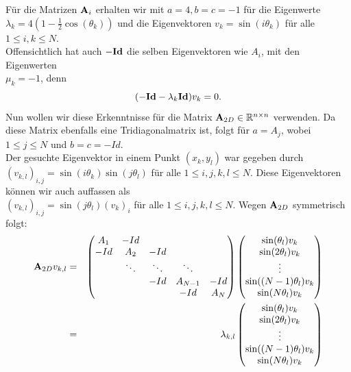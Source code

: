 Für die Matrizen ${\textbf{A}}_{i}$ erhalten wir mit $a = 4, b = c = -1$ für die Eigenwerte \\$\lambda_{k} = 4 (1 - \frac{1}{2} \cos(\theta_{k}))$ und die Eigenvektoren $v_{k} = \sin(i\theta_{k})$ für alle $1 \le i,k \le N$.\\
Offensichtlich hat auch $-{\textbf{Id}}$ die selben Eigenvektoren wie $A_{i}$, mit den Eigenwerten \\$\mu_{k} = -1$, denn
\begin{equation}
(-{\textbf{Id}} - \lambda_{k}{\textbf{Id}}) v_{k} = 0.
\end{equation}
Nun wollen wir diese Erkenntnisse für die Matrix ${\textbf{A}}_{2D} \in \mathbb{R}^{n \times n}$ verwenden. Da diese Matrix ebenfalls eine Tridiagonalmatrix ist, folgt für $a = A_{j}$, wobei $1 \le j \le N$ und $b = c = -Id$.\\
Der gesuchte Eigenvektor in einem Punkt $(x_{k},y_{l})$ war gegeben durch $(v_{k,l})_{i,j} = \sin(i\theta_{k}) \sin(j\theta_{l})$ für alle $1 \le i,j,k,l \le N$. Diese Eigenvektoren können wir auch auffassen als \\$(v_{k,l})_{i,j} = \sin(j\theta_{l})(v_{k})_{i}$ für alle $1 \le i,j,k,l \le N$. Wegen ${\textbf{A}}_{2D}$ symmetrisch folgt:
\begin{eqnarray}
{\textbf{A}}_{2D}v_{k,l} &=& 
\begin{pmatrix}
A_{1} & -Id\\
-Id & A_{2} & -Id\\
    & \ddots & \ddots & \ddots\\
   	&		 & -Id    & A_{N-1} & -Id\\
   	&		 &		  & -Id    & A_{N}
\end{pmatrix}
\begin{pmatrix}
\sin(\theta_{l}) v_{k}\\
\sin(2\theta_{l}) v_{k}\\
\vdots\\
\sin((N-1)\theta_{l}) v_{k}\\
\sin(N\theta_{l}) v_{k}\\
\end{pmatrix}\notag\\
&=& \lambda_{k,l}
\begin{pmatrix}
\sin(\theta_{l}) v_{k}\\
\sin(2\theta_{l}) v_{k}\\
\vdots\\
\sin((N-1)\theta_{l}) v_{k}\\
\sin(N\theta_{l}) v_{k}\\
\end{pmatrix}\notag
\end{eqnarray}

